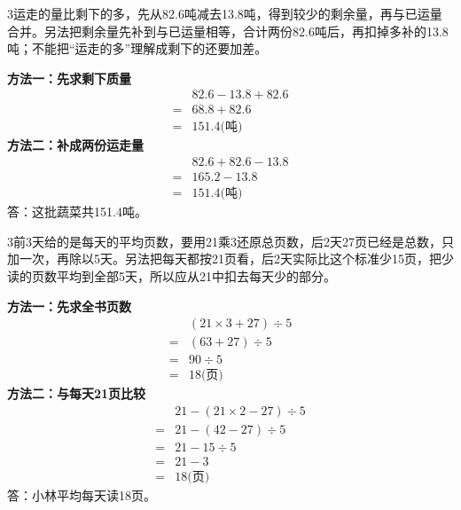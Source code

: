 \documentclass[multi=snippet,border={5bp 20bp 5bp 5bp}]{standalone}
\newenvironment{snippet}[3]{\begin{minipage}{#1bp}\color{answerred}\fontsize{#2}{#3}\selectfont\raggedright}{\end{minipage}}
\begin{document}
\begin{snippet}{505}{11.5}{14}\begin{multicols}{3}\raggedcolumns 运走的量比剩下的多，先从82.6吨减去13.8吨，得到较少的剩余量，再与已运量合并。另法把剩余量先补到与已运量相等，合计两份82.6吨后，再扣掉多补的13.8吨；不能把“运走的多”理解成剩下的还要加差。\par \textbf{方法一：先求剩下质量}\[\begin{aligned} &82.6-13.8+82.6\\={}&68.8+82.6\\={}&151.4\text{(吨)}\end{aligned}\]\textbf{方法二：补成两份运走量}\[\begin{aligned} &82.6+82.6-13.8\\={}&165.2-13.8\\={}&151.4\text{(吨)}\end{aligned}\]答：这批蔬菜共151.4吨。\end{multicols}\end{snippet}
\begin{snippet}{505}{11.5}{14}\begin{multicols}{3}\raggedcolumns 前3天给的是每天的平均页数，要用21乘3还原总页数，后2天27页已经是总数，只加一次，再除以5天。另法把每天都按21页看，后2天实际比这个标准少15页，把少读的页数平均到全部5天，所以应从21中扣去每天少的部分。\par \textbf{方法一：先求全书页数}\[\begin{aligned} &(21\times3+27)\div5\\={}&(63+27)\div5\\={}&90\div5\\={}&18\text{(页)}\end{aligned}\]\textbf{方法二：与每天21页比较}\[\begin{aligned} &21-(21\times2-27)\div5\\={}&21-(42-27)\div5\\={}&21-15\div5\\={}&21-3\\={}&18\text{(页)}\end{aligned}\]答：小林平均每天读18页。\end{multicols}\end{snippet}
\end{document}
